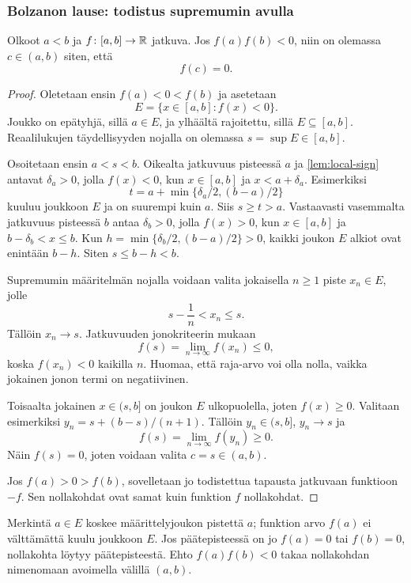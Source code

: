 \documentclass[11pt,a4paper]{amsart}
\begin{document}
\newpage
\subsubsection*{Bolzanon lause: todistus supremumin avulla}

\begin{theorem}
  \label{thm:bolzano}
  Olkoot $a<b$ ja $f\colon[a,b]\to\mathbb{R}$ jatkuva.
  Jos $f(a)f(b)<0$, niin on olemassa $c\in(a,b)$ siten, että
  \[
    \boxed{f(c)=0.}
  \]
\end{theorem}
\begin{proof}
  Oletetaan ensin $f(a)<0<f(b)$ ja asetetaan
  \[
    E=\{x\in[a,b]:f(x)<0\}.
  \]
  Joukko on epätyhjä, sillä $a\in E$, ja ylhäältä rajoitettu,
  sillä $E\subseteq[a,b]$. Reaalilukujen täydellisyyden nojalla
  on olemassa $s=\sup E\in[a,b]$.

  Osoitetaan ensin $a<s<b$.
  Oikealta jatkuvuus pisteessä $a$ ja \cref{lem:local-sign}
  antavat $\delta_a>0$, jolla $f(x)<0$, kun
  $x\in[a,b]$ ja $x<a+\delta_a$. Esimerkiksi
  \[
    t=a+\min\{\delta_a/2,(b-a)/2\}
  \]
  kuuluu joukkoon $E$ ja on suurempi kuin $a$.
  Siis $s\ge t>a$.
  Vastaavasti vasemmalta jatkuvuus pisteessä $b$ antaa
  $\delta_b>0$, jolla $f(x)>0$, kun
  $x\in[a,b]$ ja $b-\delta_b<x\le b$.
  Kun $h=\min\{\delta_b/2,(b-a)/2\}>0$, kaikki joukon $E$
  alkiot ovat enintään $b-h$. Siten $s\le b-h<b$.

  Supremumin määritelmän nojalla voidaan valita jokaisella
  $n\ge1$ piste $x_n\in E$, jolle
  \[
    s-\frac1n<x_n\le s.
  \]
  Tällöin $x_n\to s$. Jatkuvuuden jonokriteerin mukaan
  \[
    f(s)=\lim_{n\to\infty}f(x_n)\le0,
  \]
  koska $f(x_n)<0$ kaikilla $n$. Huomaa, että raja-arvo
  voi olla nolla, vaikka jokainen jonon termi on negatiivinen.

  Toisaalta jokainen $x\in(s,b]$ on joukon $E$ ulkopuolella,
  joten $f(x)\ge0$. Valitaan esimerkiksi
  $y_n=s+(b-s)/(n+1)$. Tällöin $y_n\in(s,b]$, $y_n\to s$ ja
  \[
    f(s)=\lim_{n\to\infty}f(y_n)\ge0.
  \]
  Näin $f(s)=0$, joten voidaan valita $c=s\in(a,b)$.

  Jos $f(a)>0>f(b)$, sovelletaan jo todistettua tapausta
  jatkuvaan funktioon $-f$. Sen nollakohdat ovat samat kuin
  funktion $f$ nollakohdat.
\end{proof}

\begin{remark}
  Merkintä $a\in E$ koskee määrittelyjoukon pistettä $a$;
  funktion arvo $f(a)$ ei välttämättä kuulu joukkoon $E$.
  Jos päätepisteessä on jo $f(a)=0$ tai $f(b)=0$, nollakohta
  löytyy päätepisteestä. Ehto $f(a)f(b)<0$ takaa nollakohdan
  nimenomaan avoimella välillä $(a,b)$.
\end{remark}
\end{document}
